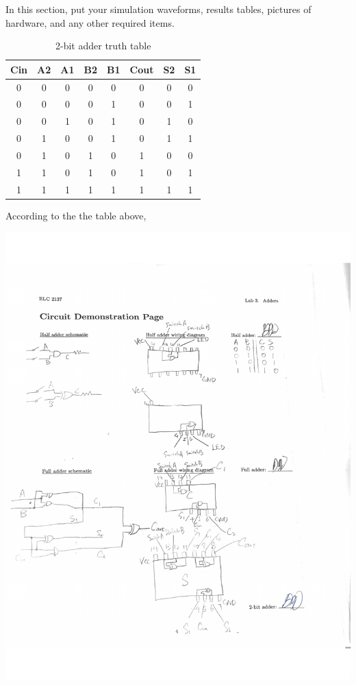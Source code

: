 \documentclass[11pt]{article}
\begin{document}
In this section, put your simulation waveforms, results tables, pictures of hardware, and any other required items.\begin{table}[ht]\centering
	\caption{2-bit adder truth table}
	\label{tbl:example_table}
	\begin{tabular}{ccccc|ccc}
		\toprule
		Cin & A2 & A1 & B2 & B1 & Cout & S2 & S1\\
		\midrule
		0 & 0 & 0 & 0 & 0 & 0 & 0 & 0 \\
		0 & 0 & 0 & 0 & 1 & 0 & 0 & 1 \\
		0 & 0 & 1 & 0 & 1 & 0 & 1 & 0 \\
		0 & 1 & 0 & 0 & 1 & 0 & 1 & 1 \\
		0 & 1 & 0 & 1 & 0 & 1 & 0 & 0 \\
		1 & 1 & 0 & 1 & 0 & 1 & 0 & 1 \\
		1 & 1 & 1 & 1 & 1 & 1 & 1 & 1 \\
		
		\bottomrule
	\end{tabular} 
\end{table}
According to the the table above, 

\includegraphics[width=\textwidth]{"circuit demonstration page"}
\end{document}
